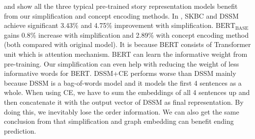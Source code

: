 \begin{table}[H]
 \scriptsize
\centering
{}
\caption{End-to-end accuracy on $SCT_v1.5$ test set with sentence
simplification and concept graph encoding. 
}
\label{tab:main1.5}
\end{table}
 
 and  show all the three typical pre-trained 
story representation models benefit from our simplification 
and concept encoding methods. 
In , SKBC and DSSM achieve significant 3.43\% and 4.75\% improvement with simplification. 
$\text{BERT}_\text{BASE}$ gains 0.8\% increase with simplification and 
2.89\% with concept encoding method (both compared with original model). 
It is because BERT consists of Transformer unit which is attention mechanism. 
BERT can learn the informative weight from pre-training. Our simplification can even 
help with reducing the weight of less informative words for BERT. DSSM+CE performs worse than DSSM 
mainly because DSSM is a bag-of-words model and it models the first 4 sentences as a whole. 
When using CE, we have to sum the embeddings of all 4 sentences up and 
then concatenate it with the output vector of DSSM as final representation. 
By doing this, we inevitably lose the order information. We can also get the same conclusion 
from  that simplification and graph embedding can benefit ending prediction.

